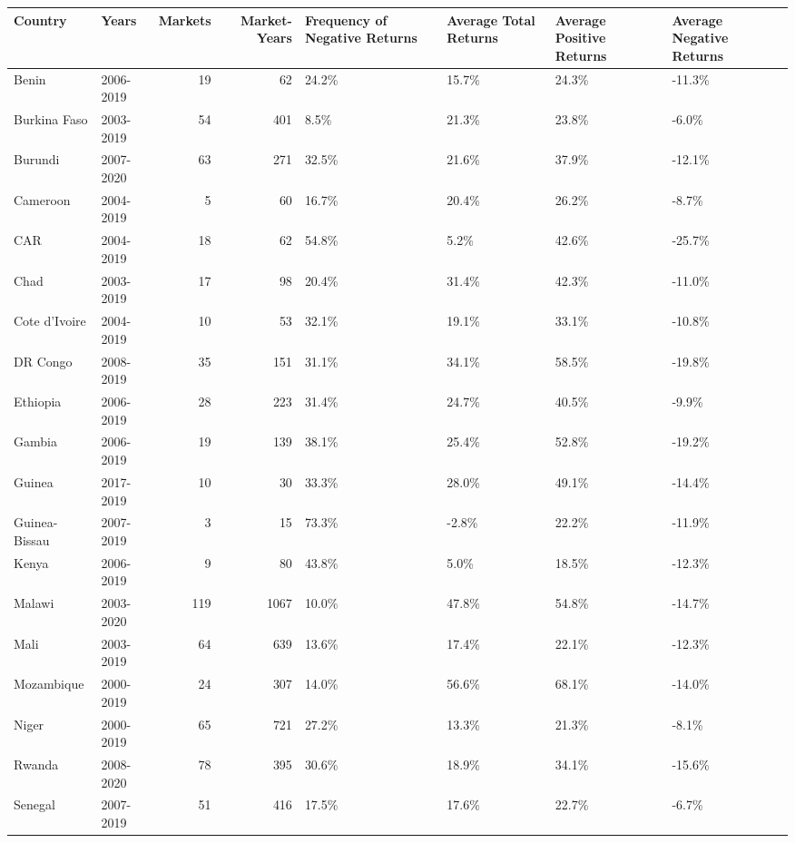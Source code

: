 \begin{table}[ht]
\centering
\begin{tabular}{llrrllll}
  \hline
Country & Years & Markets & Market-Years & Frequency of Negative Returns & Average Total Returns & Average Positive Returns & Average Negative Returns \\ 
  \hline
Benin & 2006-2019 &  19 &  62 & 24.2\% & 15.7\% & 24.3\% & -11.3\% \\ 
  Burkina Faso & 2003-2019 &  54 & 401 & 8.5\% & 21.3\% & 23.8\% & -6.0\% \\ 
  Burundi & 2007-2020 &  63 & 271 & 32.5\% & 21.6\% & 37.9\% & -12.1\% \\ 
  Cameroon & 2004-2019 &   5 &  60 & 16.7\% & 20.4\% & 26.2\% & -8.7\% \\ 
  CAR & 2004-2019 &  18 &  62 & 54.8\% & 5.2\% & 42.6\% & -25.7\% \\ 
  Chad & 2003-2019 &  17 &  98 & 20.4\% & 31.4\% & 42.3\% & -11.0\% \\ 
  Cote d'Ivoire & 2004-2019 &  10 &  53 & 32.1\% & 19.1\% & 33.1\% & -10.8\% \\ 
  DR Congo & 2008-2019 &  35 & 151 & 31.1\% & 34.1\% & 58.5\% & -19.8\% \\ 
  Ethiopia & 2006-2019 &  28 & 223 & 31.4\% & 24.7\% & 40.5\% & -9.9\% \\ 
  Gambia & 2006-2019 &  19 & 139 & 38.1\% & 25.4\% & 52.8\% & -19.2\% \\ 
  Guinea & 2017-2019 &  10 &  30 & 33.3\% & 28.0\% & 49.1\% & -14.4\% \\ 
  Guinea-Bissau & 2007-2019 &   3 &  15 & 73.3\% & -2.8\% & 22.2\% & -11.9\% \\ 
  Kenya & 2006-2019 &   9 &  80 & 43.8\% & 5.0\% & 18.5\% & -12.3\% \\ 
  Malawi & 2003-2020 & 119 & 1067 & 10.0\% & 47.8\% & 54.8\% & -14.7\% \\ 
  Mali & 2003-2019 &  64 & 639 & 13.6\% & 17.4\% & 22.1\% & -12.3\% \\ 
  Mozambique & 2000-2019 &  24 & 307 & 14.0\% & 56.6\% & 68.1\% & -14.0\% \\ 
  Niger & 2000-2019 &  65 & 721 & 27.2\% & 13.3\% & 21.3\% & -8.1\% \\ 
  Rwanda & 2008-2020 &  78 & 395 & 30.6\% & 18.9\% & 34.1\% & -15.6\% \\ 
  Senegal & 2007-2019 &  51 & 416 & 17.5\% & 17.6\% & 22.7\% & -6.7\% \\ 

\end{tabular}
\end{table}
